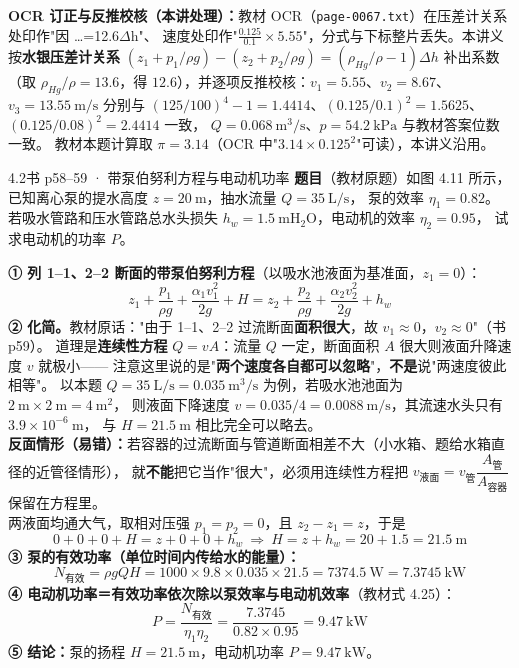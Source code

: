 \begin{tishi}
\textbf{OCR 订正与反推校核（本讲处理）：}教材 OCR（\texttt{page-0067.txt}）在压差计关系处印作"因 …=12.6$\Delta$h"、
速度处印作"$\frac{0.125}{0.1}\times5.55$"，分式与下标整片丢失。本讲义按\textbf{水银压差计关系}
$\left(z_1+p_1/\rho g\right)-\left(z_2+p_2/\rho g\right)=\left(\rho_{Hg}/\rho-1\right)\Delta h$ 补出系数
（取 $\rho_{Hg}/\rho=13.6$，得 $12.6$），并逐项反推校核：$v_1=5.55$、$v_2=8.67$、$v_3=13.55\ \mathrm{m/s}$
分别与 $\left(125/100\right)^4-1=1.4414$、$\left(0.125/0.1\right)^2=1.5625$、$\left(0.125/0.08\right)^2=2.4414$ 一致，
$Q=0.068\ \mathrm{m^3/s}$、$p=54.2\ \mathrm{kPa}$ 与教材答案位数一致。
教材本题计算取 $\pi=3.14$（OCR 中"$3.14\times0.125^2$"可读），本讲义沿用。
\end{tishi}

\begin{liti}{4.2}{书 p58--59 · 带泵伯努利方程与电动机功率}
\textbf{题目}（教材原题）如图 4.11 所示，已知离心泵的提水高度 $z=20\ \mathrm{m}$，抽水流量 $Q=35\ \mathrm{L/s}$，
泵的效率 $\eta_1=0.82$。若吸水管路和压水管路总水头损失 $h_w=1.5\ \mathrm{mH_2O}$，电动机的效率 $\eta_2=0.95$，
试求电动机的功率 $P$。


\begin{jie}
\textbf{① 列 1--1、2--2 断面的带泵伯努利方程}（以吸水池液面为基准面，$z_1=0$）：
\[ z_1+\frac{p_1}{\rho g}+\frac{\alpha_1v_1^2}{2g}+H=z_2+\frac{p_2}{\rho g}+\frac{\alpha_2v_2^2}{2g}+h_w \]
\textbf{② 化简。}教材原话："由于 1--1、2--2 过流断面\textbf{面积很大}，故 $v_1\approx0$，$v_2\approx0$"（书 p59）。
道理是\textbf{连续性方程} $Q=vA$：流量 $Q$ 一定，断面面积 $A$ 很大则液面升降速度 $v$ 就极小——
注意这里说的是"\textbf{两个速度各自都可以忽略}"，\textbf{不是}说"两速度彼此相等"。
以本题 $Q=35\ \mathrm{L/s}=0.035\ \mathrm{m^3/s}$ 为例，若吸水池池面为 $2\ \mathrm{m}\times2\ \mathrm{m}=4\ \mathrm{m^2}$，
则液面下降速度 $v=0.035/4=0.0088\ \mathrm{m/s}$，其流速水头只有 $3.9\times10^{-6}\ \mathrm{m}$，
与 $H=21.5\ \mathrm{m}$ 相比完全可以略去。\\[2pt]
\textbf{反面情形（易错）：}若容器的过流断面与管道断面相差不大（小水箱、题给水箱直径的近管径情形），
就\textbf{不能}把它当作"很大"，必须用连续性方程把 $v_{\text{液面}}=v_{\text{管}}\dfrac{A_{\text{管}}}{A_{\text{容器}}}$ 保留在方程里。\\[2pt]
两液面均通大气，取相对压强 $p_1=p_2=0$，且 $z_2-z_1=z$，于是
\[ 0+0+0+H=z+0+0+h_w\ \Longrightarrow\ H=z+h_w=20+1.5=21.5\ \mathrm{m} \]
\textbf{③ 泵的有效功率（单位时间内传给水的能量）：}
\[ N_{\text{有效}}=\rho gQH=1000\times9.8\times0.035\times21.5=7374.5\ \mathrm{W}=7.3745\ \mathrm{kW} \]
\textbf{④ 电动机功率＝有效功率依次除以泵效率与电动机效率}（教材式 4.25）：
\[ P=\frac{N_{\text{有效}}}{\eta_1\eta_2}=\frac{7.3745}{0.82\times0.95}=9.47\ \mathrm{kW} \]
\textbf{⑤ 结论：}泵的扬程 $H=21.5\ \mathrm{m}$，电动机功率 $P=9.47\ \mathrm{kW}$。
\end{jie}
\end{liti}


